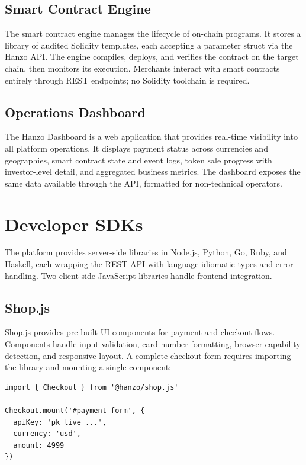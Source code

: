 \documentclass[11pt,letterpaper]{article}
\begin{document}
\subsection{Smart Contract Engine}

The smart contract engine manages the lifecycle of on-chain programs.  It
stores a library of audited Solidity templates, each accepting a parameter
struct via the Hanzo API.  The engine compiles, deploys, and verifies the
contract on the target chain, then monitors its execution.  Merchants interact
with smart contracts entirely through REST endpoints; no Solidity toolchain
is required.

\subsection{Operations Dashboard}

The Hanzo Dashboard is a web application that provides real-time visibility
into all platform operations.  It displays payment status across currencies
and geographies, smart contract state and event logs, token sale progress with
investor-level detail, and aggregated business metrics.  The dashboard exposes
the same data available through the API, formatted for non-technical operators.

\section{Developer SDKs}
\label{sec:sdks}

The platform provides server-side libraries in Node.js, Python, Go, Ruby, and
Haskell, each wrapping the REST API with language-idiomatic types and error
handling.  Two client-side JavaScript libraries handle frontend integration.

\subsection{Shop.js}

Shop.js provides pre-built UI components for payment and checkout flows.
Components handle input validation, card number formatting, browser capability
detection, and responsive layout.  A complete checkout form requires importing
the library and mounting a single component:

\begin{verbatim}
import { Checkout } from '@hanzo/shop.js'

Checkout.mount('#payment-form', {
  apiKey: 'pk_live_...',
  currency: 'usd',
  amount: 4999
})
\end{verbatim}
\end{document}
